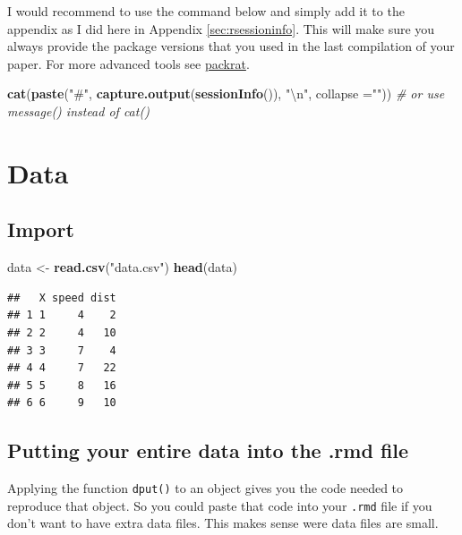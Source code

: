 \documentclass[
  12pt,
]{article}
\newenvironment{Shaded}{\begin{snugshade}}{\end{snugshade}}
\newcommand{\CharTok}[1]{\textcolor[rgb]{0.31,0.60,0.02}{#1}}
\newcommand{\CommentTok}[1]{\textcolor[rgb]{0.56,0.35,0.01}{\textit{#1}}}
\newcommand{\DataTypeTok}[1]{\textcolor[rgb]{0.13,0.29,0.53}{#1}}
\newcommand{\KeywordTok}[1]{\textcolor[rgb]{0.13,0.29,0.53}{\textbf{#1}}}
\newcommand{\NormalTok}[1]{#1}
\newcommand{\StringTok}[1]{\textcolor[rgb]{0.31,0.60,0.02}{#1}}
\begin{document}
I would recommend to use the command below and simply add it to the appendix as I did here in Appendix \ref{sec:rsessioninfo}. This will make sure you always provide the package versions that you used in the last compilation of your paper. For more advanced tools see \href{https://rstudio.github.io/packrat/}{packrat}.

\begin{Shaded}
\begin{Highlighting}[]
\KeywordTok{cat}\NormalTok{(}\KeywordTok{paste}\NormalTok{(}\StringTok{"#"}\NormalTok{, }\KeywordTok{capture.output}\NormalTok{(}\KeywordTok{sessionInfo}\NormalTok{()), }\StringTok{"}\CharTok{\textbackslash{}n}\StringTok{"}\NormalTok{, }\DataTypeTok{collapse =}\StringTok{""}\NormalTok{)) }
  \CommentTok{# or use message() instead of cat()}
\end{Highlighting}
\end{Shaded}

\hypertarget{data}{%
\section{Data}\label{data}}

\hypertarget{import}{%
\subsection{Import}\label{import}}

\begin{Shaded}
\begin{Highlighting}[]
\NormalTok{data <-}\StringTok{ }\KeywordTok{read.csv}\NormalTok{(}\StringTok{"data.csv"}\NormalTok{)}
\KeywordTok{head}\NormalTok{(data)}
\end{Highlighting}
\end{Shaded}

\begin{verbatim}
##   X speed dist
## 1 1     4    2
## 2 2     4   10
## 3 3     7    4
## 4 4     7   22
## 5 5     8   16
## 6 6     9   10
\end{verbatim}

\hypertarget{putting-your-entire-data-into-the-.rmd-file}{%
\subsection{Putting your entire data into the .rmd file}\label{putting-your-entire-data-into-the-.rmd-file}}

Applying the function \texttt{dput()} to an object gives you the code needed to reproduce that object. So you could paste that code into your \texttt{.rmd} file if you don't want to have extra data files. This makes sense were data files are small.
\end{document}
